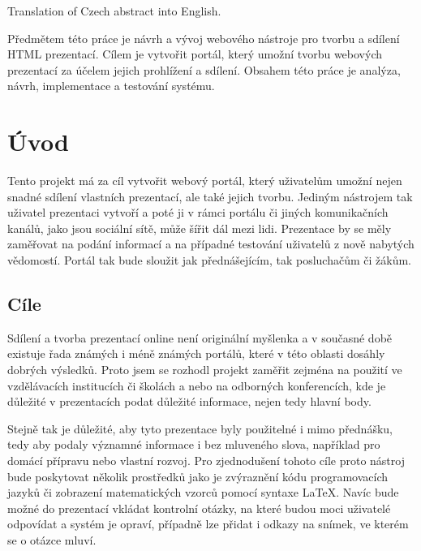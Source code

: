 \documentclass[11pt,twoside,a4paper]{book}
\begin{document}
	Translation of Czech abstract into English.


	\baselineskip

	\noindent
	Předmětem této práce je návrh a vývoj webového nástroje pro tvorbu a sdílení HTML prezentací. Cílem je vytvořit portál, který umožní tvorbu webových prezentací za účelem jejich prohlížení a sdílení. Obsahem této práce je analýza, návrh, implementace a testování systému.

	\tableofcontents		%

	\listoffigures			%

	\mainbodystarts



\chapter{Úvod}
Tento projekt má za cíl vytvořit webový portál, který uživatelům umožní nejen snadné sdílení vlastních prezentací, ale také jejich tvorbu. Jediným nástrojem tak uživatel prezentaci vytvoří a poté ji v rámci portálu či jiných komunikačních kanálů, jako jsou sociální sítě, může šířit dál mezi lidi. Prezentace by se měly zaměřovat na podání informací a na případné testování uživatelů z nově nabytých vědomostí. Portál tak bude sloužit jak přednášejícím, tak posluchačům či žákům.

\section{Cíle}
Sdílení a tvorba prezentací online není originální myšlenka a v současné době existuje řada známých i méně známých portálů, které v této oblasti dosáhly dobrých výsledků. Proto jsem se rozhodl projekt zaměřit zejména na použití ve vzdělávacích institucích či školách a nebo na odborných konferencích, kde je důležité v prezentacích podat důležité informace, nejen tedy hlavní body.

Stejně tak je důležité, aby tyto prezentace byly použitelné i mimo přednášku, tedy aby podaly významné informace i bez mluveného slova, například pro domácí přípravu nebo vlastní rozvoj. Pro zjednodušení tohoto cíle proto nástroj bude poskytovat několik prostředků jako je zvýraznění kódu programovacích jazyků či zobrazení matematických vzorců pomocí syntaxe \LaTeX. Navíc bude možné do prezentací vkládat kontrolní otázky, na které budou moci uživatelé odpovídat a systém je opraví, případně lze přidat i odkazy na snímek, ve kterém se o otázce mluví.
\end{document}
